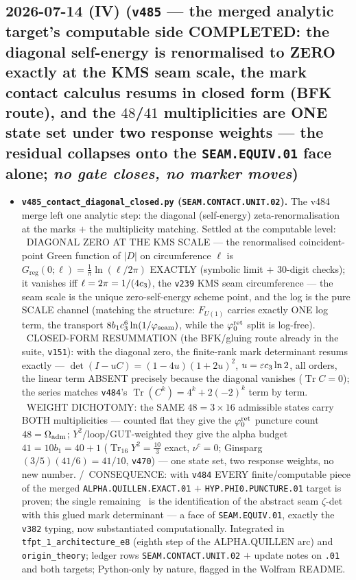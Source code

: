 \subsection*{2026-07-14 (IV) (\texttt{v485} --- the merged analytic target's computable side COMPLETED: the diagonal self-energy is renormalised to ZERO exactly at the KMS seam scale, the mark contact calculus resums in closed form (BFK route), and the $48$/$41$ multiplicities are ONE state set under two response weights --- the residual collapses onto the \texttt{SEAM.EQUIV.01} face alone; \emph{no gate closes, no marker moves})}
\begin{itemize}[leftmargin=1.5em]
\item \textbf{\texttt{v485\_contact\_diagonal\_closed.py} (\texttt{SEAM.CONTACT.UNIT.02}).} The v484
merge left one analytic step: the diagonal (self-energy) zeta-renormalisation at the marks $+$ the
multiplicity matching. Settled at the computable level: \mE\ DIAGONAL ZERO AT THE KMS SCALE --- the
renormalised coincident-point Green function of $|D|$ on circumference $\ell$ is
$G_{\mathrm{reg}}(0;\ell)=\tfrac1\pi\ln(\ell/2\pi)$ EXACTLY (symbolic limit $+$ $30$-digit checks); it
vanishes iff $\ell=2\pi=1/(4c_3)$, the \texttt{v239} KMS seam circumference --- the seam scale is the
unique zero-self-energy scheme point, and the log is the pure SCALE channel (matching the structure:
$F_{U(1)}$ carries exactly ONE log term, the transport $8b_1c_3^6\ln(1/\varphi_{\mathrm{seam}})$,
while the $\varphi_0^{\mathrm{ret}}$ split is log-free). \mE\ CLOSED-FORM RESUMMATION (the BFK/gluing route already in the
suite, \texttt{v151}): with the diagonal zero, the finite-rank mark determinant resums exactly ---
$\det(I-uC)=(1-4u)(1+2u)^2$, $u=\varepsilon c_3\ln2$, all orders, the linear term ABSENT precisely
because the diagonal vanishes ($\operatorname{Tr}C=0$); the series matches \texttt{v484}'s
$\operatorname{Tr}(C^k)=4^k+2(-2)^k$ term by term. \mE\ WEIGHT DICHOTOMY: the SAME $48=3\times16$
admissible states carry BOTH multiplicities --- counted flat they give the $\varphi_0^{\mathrm{ret}}$ puncture count
$48=\Omega_{\mathrm{adm}}$; $Y^2$/loop/GUT-weighted they give the alpha budget $41=10b_1=40+1$
($\operatorname{Tr}_{16}Y^2=\tfrac{10}3$ exact, $\nu^c=0$; Ginsparg $(3/5)(41/6)=41/10$, \texttt{v470})
--- one state set, two response weights, no new number. \mC/\mO\ CONSEQUENCE: with \texttt{v484} EVERY
finite/computable piece of the merged \texttt{ALPHA.QUILLEN.EXACT.01} $+$ \texttt{HYP.PHI0.PUNCTURE.01}
target is proven; the single remaining \mO\ is the identification of the abstract seam $\zeta$-det with
this glued mark determinant --- a face of \texttt{SEAM.EQUIV.01}, exactly the \texttt{v382} typing, now
substantiated computationally. Integrated in \texttt{tfpt\_1\_architecture\_e8} (eighth step of the
ALPHA.QUILLEN arc) and \texttt{origin\_theory}; ledger rows \texttt{SEAM.CONTACT.UNIT.02} $+$ update
notes on \texttt{.01} and both targets; Python-only by nature, flagged in the Wolfram README.
\end{itemize}


